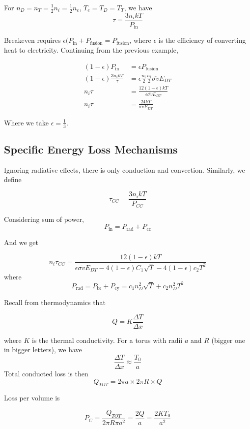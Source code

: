 \documentclass[12pt]{article}
\begin{document}
\begin{ex}
    For $n_D = n_T = \frac{1}{2} n_i = \frac{1}{2} n_e$, $T_e = T_D = T_T$, we have
    $$\tau = \frac{3n_ikT}{P_{\text{in}}}$$
\end{ex}

Breakeven requires $\epsilon(P_{\text{in}} + P_{\text{fusion}} = P_{\text{fusion}}$, where $\epsilon$ is the efficiency of converting heat to electricity. Continuing from the previous example,

\begin{align*}
    (1-\epsilon)P_{\text{in}} &= \epsilon P_{\text{fusion}} \\
    (1-\epsilon) \frac{3n_ikT}{\tau} &= \epsilon \frac{n_i}{2} \frac{n_i}{2} \overline{\sigma v} E_{DT} \\
    n_i\tau &= \frac{12(1-\epsilon)kT}{\epsilon\overline{\sigma v}E_{DT}} \\
    n_i\tau &= \frac{24kT}{\overline{\sigma v}E_{DT}}
\end{align*}

Where we take $\epsilon = \frac{1}{3}$.

\subsection{Specific Energy Loss Mechanisms}

Ignoring radiative effects, there is only conduction and convection. Similarly, we define

$$\tau_{CC} = \frac{3n_ikT}{P_{CC}}$$

Considering sum of power,
$$P_{\text{in}} = P_{\text{rad}} + P_{\text{cc}}$$

And we get

$$n_i\tau_{CC} = \frac{12(1-\epsilon)kT}{\epsilon\overline{\sigma v}E_{DT} - 4(1-\epsilon)C_1\sqrt{T} - 4(1-\epsilon)c_2T^2}$$
where
$$P_{\text{rad}} = P_{\text{br}} + P_{\text{cy}} = c_1n_D^2\sqrt{T} + c_2n_D^2T^2$$

Recall from thermodynamics that

$$Q = K\frac{\Delta T}{\Delta x}$$

where $K$ is the thermal conductivity. For a torus with radii $a$ and $R$ (bigger one in bigger letters), we have
$$\frac{\Delta T}{\Delta x} \approx \frac{T_0}{a}$$
Total conducted loss is then
$$Q_{TOT} = 2\pi a \times 2\pi R \times Q$$

Loss per volume is

$$P_C = \frac{Q_{TOT}}{2\pi R\pi a^2} = \frac{2Q}{a} = \frac{2KT_0}{a^2}$$
\end{document}

